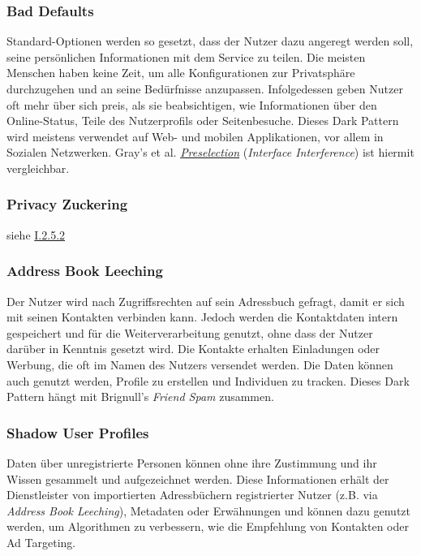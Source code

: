 \documentclass[a4paper]{article}
\begin{document}
\subsubsection{Bad Defaults}
\label{sssec:bad_defaults}
Standard-Optionen werden so gesetzt, dass der Nutzer dazu angeregt werden soll, seine persönlichen Informationen mit dem Service zu teilen. Die meisten Menschen haben keine Zeit, um alle Konfigurationen zur Privatsphäre durchzugehen und an seine Bedürfnisse anzupassen. Infolgedessen geben Nutzer oft mehr über sich preis, als sie beabsichtigen, wie Informationen über den Online-Status, Teile des Nutzerprofils oder Seitenbesuche. Dieses Dark Pattern wird meistens verwendet auf Web- und mobilen Applikationen, vor allem in Sozialen Netzwerken.\newline 
Gray's et al. \hyperref[para:preselection]{\textit{Preselection}} (\textit{Interface Interference}) ist hiermit vergleichbar.

\subsubsection{Privacy Zuckering}
\label{sssec:privacy_zuckering2}
siehe \hyperref[para:privacy_zuckering]{I.2.5.2}

\subsubsection{Address Book Leeching}
\label{sssec:address_book_leeching}
Der Nutzer wird nach Zugriffsrechten auf sein Adressbuch gefragt, damit er sich mit seinen Kontakten verbinden kann. Jedoch werden die Kontaktdaten intern gespeichert und für die Weiterverarbeitung genutzt, ohne dass der Nutzer darüber in Kenntnis gesetzt wird. Die Kontakte erhalten Einladungen oder Werbung, die oft im Namen des Nutzers versendet werden. Die Daten können auch genutzt werden, Profile zu erstellen und Individuen zu tracken.\newline
Dieses Dark Pattern hängt mit Brignull's \textit{Friend Spam} zusammen.

\subsubsection{Shadow User Profiles}
\label{sssec:shadow_user_profiles}
Daten über unregistrierte Personen können ohne ihre Zustimmung und ihr Wissen gesammelt und aufgezeichnet werden. Diese Informationen erhält der Dienstleister von importierten Adressbüchern registrierter Nutzer (z.B. via \textit{Address Book Leeching}), Metadaten oder Erwähnungen und können dazu genutzt werden, um Algorithmen zu verbessern, wie die Empfehlung von Kontakten oder Ad Targeting.
\end{document}
